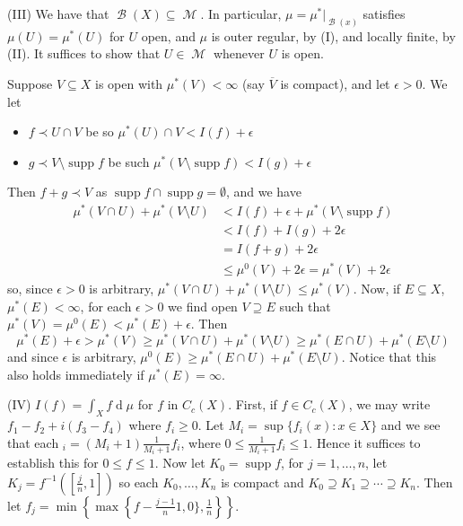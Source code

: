 \documentclass[12pt, a4paper]{memoir}
\theoremstyle{nonumberplain}
\DeclareMathOperator{\M}{\mathcal{M}}
\DeclareMathOperator{\B}{\mathcal{B}}
\DeclareMathOperator{\supp}{supp}
\renewcommand{\d}[1]{\ensuremath{\operatorname{d}\!{#1}}} %
\begin{document}
(III) We have that $\B(X)\subseteq\M$.
In particular, $\mu=\mu^*|_{\B(x)}$ satisfies $\mu(U)=\mu^*(U)$ for $U$ open, and $\mu$ is outer regular, by (I), and locally finite, by (II).
It suffices to show that $U\in\M$ whenever $U$ is open.

Suppose $V\subseteq X$ is open with $\mu^*(V)<\infty$ (say $\overline{V}$ is compact), and let $\epsilon>0$.
We let
\begin{itemize}[nl]
    \item $f\prec U\cap V$ be so $\mu^*(U)\cap V<I(f)+\epsilon$
    \item $g\prec V\setminus\supp f$ be such $\mu^*(V\setminus\supp f)< I(g)+\epsilon$
\end{itemize}
Then $f+g\prec V$ as $\supp f\cap\supp g=\emptyset$, and we have
\begin{align*}
    \mu^*(V\cap U)+\mu^*(V\setminus U) &< I(f)+\epsilon+\mu^*(V\setminus\supp f)\\
                                       &< I(f)+I(g)+2\epsilon\\
                                       &= I(f+g)+2\epsilon\\
                                       &\leq \mu^0(V)+2\epsilon=\mu^*(V)+2\epsilon
\end{align*}
so, since $\epsilon>0$ is arbitrary, $\mu^*(V\cap U)+\mu^*(V\setminus U)\leq\mu^*(V)$.
Now, if $E\subseteq X$, $\mu^*(E)<\infty$, for each $\epsilon>0$ we find open $V\supseteq E$ such that $\mu^*(V)=\mu^0(E)<\mu^*(E)+\epsilon$.
Then
\begin{equation*}
    \mu^*(E)+\epsilon > \mu^*(V) \geq \mu^*(V\cap U)+\mu^*(V\setminus U)\geq\mu^*(E\cap U)+\mu^*(E\setminus U)
\end{equation*}
and since $\epsilon$ is arbitrary, $\mu^0(E)\geq\mu^*(E\cap U)+\mu^*(E\setminus U)$.
Notice that this also holds immediately if $\mu^*(E)=\infty$.

(IV) $I(f)=\int_X f\d{\mu}$ for $f$ in $C_c(X)$.
First, if $f\in C_c(X)$, we may write $f_1-f_2+i(f_3-f_4)$ where $f_i\geq 0$.
Let $M_i=\sup\{f_i(x):x\in X\}$ and we see that each $_i=(M_i+1)\frac{1}{M_i+1}f_i$, where $0\leq\frac{1}{M_i+1}f_i\leq 1$.
Hence it suffices to establish this for $0\leq f\leq 1$.
Now let $K_0=\supp f$, for $j=1,\ldots,n$, let $K_j=f^{-1}\left(\left[\frac{j}{n},1\right]\right)$ so each $K_0,\ldots,K_n$ is compact and $K_0\supseteq K_1\supseteq\cdots\supseteq K_n$.
Then let $f_j=\min\left\{\max\left\{f-\frac{j-1}{n}1,0\},\frac{1}{n}\right\}\right\}$.
\end{document}

